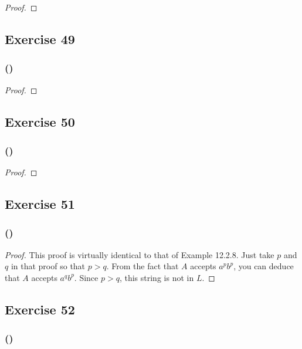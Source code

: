 \documentclass[14pt]{extarticle}
\begin{document}
\begin{proof}

\end{proof}

\subsection{Exercise 49}

\subsubsection{()}

\begin{proof}

\end{proof}

\subsection{Exercise 50}

\subsubsection{()}

\begin{proof}

\end{proof}

\subsection{Exercise 51}

\subsubsection{()}

\begin{proof}
This proof is virtually identical to that of Example 12.2.8. Just take \(p\) and \(q\) in that proof so that \(p > q\). 
From the fact that \(A\) accepts \(a^pb^p\), you can deduce that \(A\) accepts \(a^qb^p\). Since \(p > q\), this string is 
not in \(L\).
\end{proof}

\subsection{Exercise 52}

\subsubsection{()}
\end{document}
